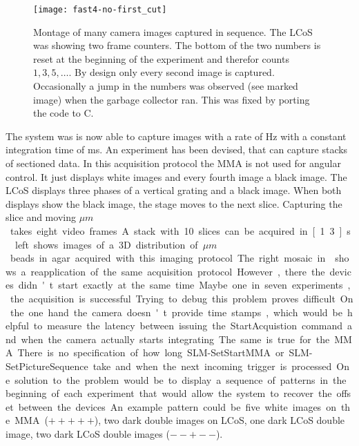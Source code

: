 \begin{figure}[!hbt]
  \centering
  \texttt{[image: fast4-no-first\_cut]}
  \caption{Montage of many camera images captured in sequence. The
    LCoS was showing two frame counters. The bottom of the two numbers
    is reset at the beginning of the experiment and therefor counts
    $1,3,5,\ldots$. By design only every second image is
    captured. Occasionally a jump in the numbers was observed (see
    marked image) when the garbage collector ran. This was fixed by
    porting the code to C.}
  \label{fig:fast4-no-first_cut}
\end{figure}

The system was is now able to capture images with a rate of
\unit[30]{Hz} with a constant integration time of \unit[16]{ms}.  An
experiment has been devised, that can capture stacks of sectioned
data. In this acquisition protocol the MMA is not used for angular
control. It just displays white images and every fourth image a black
image. The LCoS displays three phases of a vertical grating and a
black image. When both displays show the black image, the stage moves
to the next slice. Capturing the slice and moving \unit[1]{$\mu m$}
takes eight video frames. A stack with 10 slices can be acquired in
\unit[1.3]{s}. ~left shows images of a 3D
distribution of \unit[2]{$\mu m$} beads in agar acquired with this
imaging protocol.

The right mosaic in  shows a reapplication of
the same acquisition protocol. However, there the devices didn't start
exactly at the same time. Maybe one in seven experiments, the
acquisition is successful. Trying to debug this problem proves
difficult.

On the one hand the camera doesn't provide time stamps, which would be
helpful to measure the latency between issuing the
\textsf{StartAcquistion} command and when the camera actually starts
integrating.  The same is true for the MMA. There is no specification
of how long \textsf{SLM-SetStartMMA} or
\textsf{SLM-SetPictureSequence} take and when the next incoming
trigger is processed.

One solution to the problem would be to display a sequence of patterns
in the beginning of each experiment that would allow the system to
recover the offset between the devices. An example pattern could be
five white images on the MMA ($+++++$), two dark double images on
LCoS, one dark LCoS double image, two dark LCoS double images ($--+--$).

